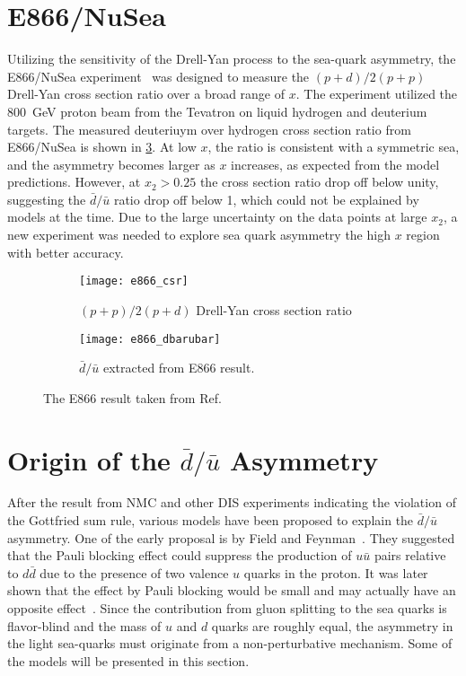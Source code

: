 \documentclass[../main.tex]{subfiles}
\begin{document}
\section{E866/NuSea}
\label{sec:E866}
Utilizing the sensitivity of the Drell-Yan process to the sea-quark asymmetry,
the E866/NuSea experiment~\cite{towell2001} was designed to measure the $(p+d)/2(p+p)$
Drell-Yan cross section ratio over a broad range of $x$. The
experiment utilized the \SI{800}{\GeV} proton beam from the Tevatron on liquid
hydrogen and deuterium targets. The measured deuteriuym over hydrogen cross section
ratio from E866/NuSea is shown in \cref{fig:e866_result}. At low $x$, the ratio is consistent
with a symmetric sea, and the asymmetry becomes larger as $x$ increases, as expected from
the model predictions. However, at $x_2>0.25$ the cross section ratio
drop off below unity, suggesting the $\bar{d}/\bar{u}$
ratio drop off below 1, which could not be explained by models at the time.
Due to the large uncertainty on the data points at large $x_2$, a new
experiment was needed to explore sea quark asymmetry the high $x$ region with better
accuracy.
\begin{figure}[htbp!]
	\centering
	\begin{subfigure}{0.45\linewidth}
		\texttt{[image: e866\_csr]}
		\caption{$(p+p)/2(p+d)$ Drell-Yan cross section ratio}
		\label{subfig:e866_csr}
	\end{subfigure}
	\begin{subfigure}{0.45\linewidth}
		\texttt{[image: e866\_dbarubar]}
		\caption{$\bar{d}/\bar{u}$ extracted from E866 result.}
		\label{subfig:e866_dbarubar}
	\end{subfigure}
	\caption{The E866 result taken from Ref.~\cite{towell2001}}
	\label{fig:e866_result}
\end{figure}

\section{Origin of the \texorpdfstring{$\bar{d}/\bar{u}$}{dbar/ubar} Asymmetry }
After the result from NMC and other DIS experiments indicating the violation of the Gottfried sum rule,
various models have been proposed to explain the $\bar{d}/\bar{u}$ asymmetry. One of the early proposal
is by Field and Feynman~\cite{field1977}. They suggested that the Pauli blocking effect
could suppress the production of $u\bar{u}$ pairs relative to  $d\bar{d}$ due to the presence of two
valence $u$ quarks in the proton. It was later shown that the effect by Pauli blocking would be small and
may actually have an opposite effect~\cite{steffens1997}. Since the contribution from gluon splitting to the
sea quarks is flavor-blind and the mass of $u$ and $d$ quarks are roughly equal, the asymmetry in the
light sea-quarks must originate from a non-perturbative mechanism. Some of the models will be presented
in this section.
\end{document}
